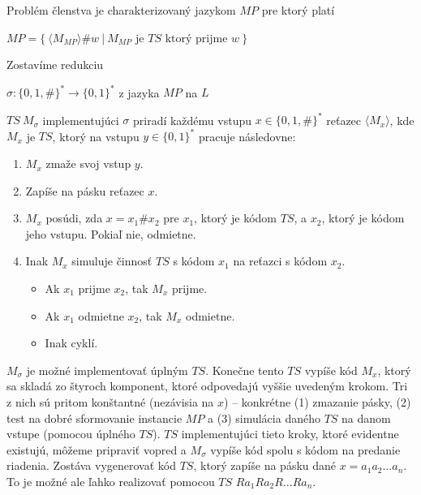 \documentclass[11pt,a4paper]{article}
\begin{document}
Problém členstva je charakterizovaný jazykom $MP$ pre ktorý platí

\begin{center}
    $MP = \{ \ \langle M_{MP} \rangle \# w  \ | \ M_{MP} \text{ je } TS \text{ ktorý prijme } w \ \}$
\end{center}

Zostavíme redukciu

\begin{center}
    $\sigma: \{0,1,\#\}^{*} \longrightarrow \{0,1\}^{*}$ z jazyka $MP$ na $L$
\end{center}

$TS \ M_{\sigma}$ implementujúci $\sigma$ priradí každému vstupu $x \in \{0,1,\#\}^{*}$ reťazec $\langle M_{x} \rangle$, kde $M_{x}$ je $TS$, ktorý na vstupu $y \in \{0,1\}^{*}$ pracuje následovne:

\begin{enumerate}
    \item $M_{x}$ zmaže svoj vstup $y$.
    \item Zapíše na pásku reťazec $x$.
    \item $M_{x}$ posúdi, zda $x=x_{1}\#x_{2}$ pre $x_1$, ktorý je kódom $TS$, a $x_2$, ktorý je kódom jeho vstupu. Pokiaľ nie, odmietne.
    \item Inak $M_{x}$ simuluje činnosť $TS$ s kódom $x_1$ na reťazci s kódom $x_2$.
        \begin{itemize}
            \item Ak $x_1$ prijme $x_2$, tak $M_x$ prijme.
            \item Ak $x_1$ odmietne $x_2$, tak $M_x$ odmietne.
            \item Inak cyklí.
        \end{itemize}
\end{enumerate}

$M_{\sigma}$ je možné implementovať úplným $TS$. Konečne tento $TS$ vypíše kód $M_x$, ktorý sa skladá zo štyroch komponent, ktoré odpovedajú vyššie uvedeným krokom. Tri z nich sú pritom konštantné (nezávisia na $x$) -- konkrétne (1) zmazanie pásky, (2) test na dobré sformovanie instancie $MP$ a (3) simulácia daného $TS$ na danom vstupe (pomocou úplného $TS$). $TS$ implementujúci tieto kroky, ktoré evidentne existujú, môžeme pripraviť vopred a $M_{\sigma}$ vypíše kód spolu s kódom na predanie riadenia. Zostáva vygenerovať kód $TS$, ktorý zapíše na pásku dané $x = a_1a_2...a_n$. To je možné ale ľahko realizovať pomocou $TS$ $Ra_1Ra_2R...Ra_n$. \\
\end{document}
